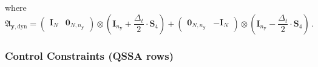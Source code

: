 \documentclass{article}
\newcommand{\kron}{\otimes}%
\newcommand{\vectorfont}[1]{\boldsymbol{#1}}%
\newcommand{\matrixfont}[1]{\mathbf{#1}}%
\newcommand{\yvec}{\vectorfont{y}}
\newcommand{\Imat}{\matrixfont{I}}%
\newcommand{\Smat}{\matrixfont{S}}
\newcommand{\Afrakmat}{\matrixfont{\mathfrak{A}}}
\newcommand{\Nullmat}{\matrixfont{0}}
\begin{document}
where
\[
\Afrakmat_{\yvec,\mathrm{dyn}} = 
\begin{pmatrix} \Imat_{N} & \Nullmat_{N,n_{\yvec}} \end{pmatrix} \kron \left(\Imat_{n_{\yvec}}+\frac{\Delta_t}{2}\cdot \Smat_4 \right)
+
\begin{pmatrix} \Nullmat_{N,n_{\yvec}} &-\Imat_N \end{pmatrix} \kron \left(\Imat_{n_{\yvec}}-\frac{\Delta_t}{2}\cdot \Smat_4 \right)\,.
\]

\subsubsection*{Control Constraints (QSSA rows)}
\end{document}
